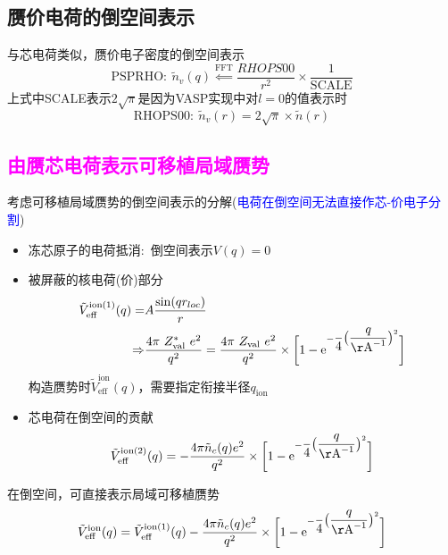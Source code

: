 \subsection{赝价电荷的倒空间表示}
与芯电荷类似，赝价电子密度的倒空间表示
\begin{displaymath}
		\mathrm{PSPRHO}:~\tilde{n}_v(q) \stackrel{\mathrm{FFT}}{\Leftarrow}\dfrac{\boxed{RHOPS00}}{r^2}\times\dfrac1{\mathrm{SCALE}}
\end{displaymath}
上式中\textrm{SCALE}表示$2\sqrt{\pi}$是因为\textrm{VASP}实现中对$l=0$的值表示时
\begin{displaymath}
	\mathrm{RHOPS00}:~\tilde{n}_v(r) = 2\sqrt{\pi}\times\tilde{n}(r)
\end{displaymath}

\subsection{\textcolor{magenta}{由赝芯电荷表示可移植局域赝势}}
考虑可移植局域赝势的倒空间表示的分解(\textcolor{blue}{电荷在倒空间无法直接作芯-价电子分割})
\begin{itemize}
	\item 冻芯原子的电荷抵消:~倒空间表示$V(q)=0$
	\item 被屏蔽的核电荷(价)部分
\begin{equation}
	\begin{aligned}
		\tilde{V}_{\mathrm{eff}}^{\mathrm{ion}(1)}(q) =& A\dfrac{\sin(qr_{loc})}r\\
		\Rightarrow & \dfrac{4\pi~Z_{\mathrm{val}}^{\ast}~e^2}{q^2} = \dfrac{4\pi~Z_{\mathrm{val}}~e^2}{q^2}\times\bigg[1-\mathrm{e}^{-\dfrac{}4\big(\dfrac{q}{\mathrm{\AA}^{-1}}\big)^2}\bigg] 
	\end{aligned}
	\label{eq:POT_G_core-EFF}
\end{equation}
构造赝势时$\tilde{V}_{\mathrm{eff}}^{\mathrm{ion}}(q)$，需要指定衔接半径$q_{\mathrm{ion}}$
	\item 芯电荷在倒空间的贡献
		\begin{equation}
			\tilde{V}_{\mathrm{eff}}^{\mathrm{ion}(2)}(q) = -\dfrac{4\pi\tilde{n}_c(q)e^2}{q^2}\times\bigg[1-\mathrm{e}^{-\dfrac{}4\big(\dfrac{q}{\mathrm{\AA}^{-1}}\big)^2}\bigg] 
			\label{eq:POT_G_core}
		\end{equation}
\end{itemize}
在倒空间，可直接表示局域可移植赝势
\begin{displaymath}
	\tilde{V}_{\mathrm{eff}}^{\mathrm{ion}}(q) = \tilde{V}_{\mathrm{eff}}^{\mathrm{ion}(1)}(q) - \dfrac{4\pi\tilde{n}_c(q)e^2}{q^2}\times\bigg[1-\mathrm{e}^{-\dfrac{}4\big(\dfrac{q}{\mathrm{\AA}^{-1}}\big)^2}\bigg] 
\end{displaymath}

